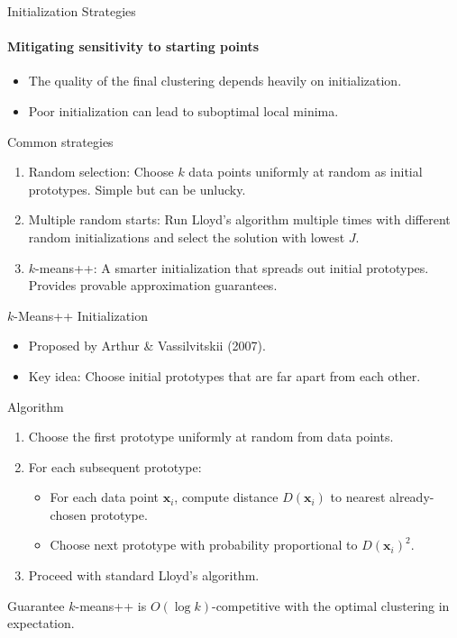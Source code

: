 \begin{frame}{Initialization Strategies}
  \framesubtitle{Mitigating sensitivity to starting points}
  \begin{itemize}
    \item The quality of the final clustering depends heavily on initialization.
    \item Poor initialization can lead to suboptimal local minima.
  \end{itemize}
  \begin{block}{Common strategies}
    \begin{enumerate}
      \item \alert{Random selection}: Choose $k$ data points uniformly at random as initial
            prototypes. Simple but can be unlucky.
      \item \alert{Multiple random starts}: Run Lloyd's algorithm multiple times with
            different random initializations and select the solution with lowest $J$.
      \item \alert{$k$-means++}: A smarter initialization that spreads out initial prototypes.
            Provides provable approximation guarantees.
    \end{enumerate}
  \end{block}
\end{frame}

\begin{frame}{$k$-Means++ Initialization}
  \begin{itemize}
    \item Proposed by Arthur \& Vassilvitskii (2007).
    \item Key idea: Choose initial prototypes that are \alert{far apart} from each other.
  \end{itemize}
  \begin{block}{Algorithm}
    \begin{enumerate}
      \item Choose the first prototype uniformly at random from data points.
      \item For each subsequent prototype:
        \begin{itemize}
          \item For each data point $\mathbf{x}_i$, compute distance $D(\mathbf{x}_i)$ to
                nearest already-chosen prototype.
          \item Choose next prototype with probability proportional to $D(\mathbf{x}_i)^2$.
        \end{itemize}
      \item Proceed with standard Lloyd's algorithm.
    \end{enumerate}
  \end{block}
  \begin{alertblock}{Guarantee}
    $k$-means++ is $O(\log k)$-competitive with the optimal clustering in expectation.
  \end{alertblock}
\end{frame}

